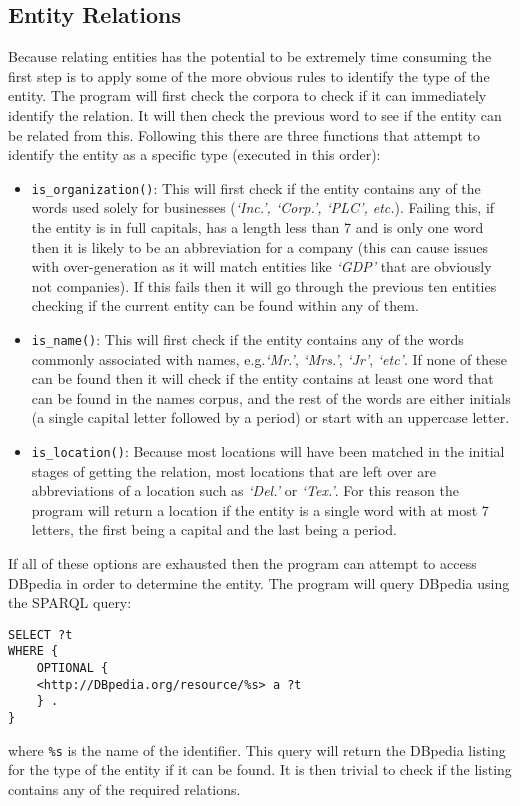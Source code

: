 \documentclass[draft]{article}
\begin{document}
\begin{multicols*}{2}
\section*{Entity Relations}
Because relating entities has the potential to be extremely time consuming the first step is to apply some of the more obvious rules to identify the type of the entity. The program will first check the corpora to check if it can immediately identify the relation. It will then check the previous word to see if the entity can be related from this. Following this there are three functions that attempt to identify the entity as a specific type (executed in this order):
\begin{itemize}
\item \texttt{is\_organization()}: This will first check if the entity contains any of the words used solely for businesses (\textit{`Inc.', `Corp.', `PLC', etc.}). Failing this, if the entity is in full capitals, has a length less than 7 and is only one word then it is likely to be an abbreviation for a company (this can cause issues with over-generation as it will match entities like \textit{`GDP'} that are obviously not companies). If this fails then it will go through the previous ten entities checking if the current entity can be found within any of them.
\item \texttt{is\_name()}: This will first check if the entity contains any of the words commonly associated with names, e.g.\textit{`Mr.'}, \textit{`Mrs.'}, \textit{`Jr'}, \textit{`etc'}. If none of these can be found then it will check if the entity contains at least one word that can be found in the names corpus, and the rest of the words are either initials (a single capital letter followed by a period) or start with an uppercase letter.
\item \texttt{is\_location()}: Because most locations will have been matched in the initial stages of getting the relation, most locations that are left over are abbreviations of a location such as \textit{`Del.'} or \textit{`Tex.'}. For this reason the program will return a location if the entity is a single word with at most 7 letters, the first being a capital and the last being a period. 
\end{itemize}

If all of these options are exhausted then the program can attempt to access DBpedia in order to determine the entity. The program will query DBpedia using the SPARQL \citep{SPARQL} query:
\begin{verbatim}
SELECT ?t
WHERE {
	OPTIONAL { 
	<http://DBpedia.org/resource/%s> a ?t 
	} .
}
\end{verbatim}
where \texttt{\%s} is the name of the identifier. This query will return the DBpedia listing for the type of the entity if it can be found. It is then trivial to check if the listing contains any of the required relations. 


\end{multicols*}
\end{document}
